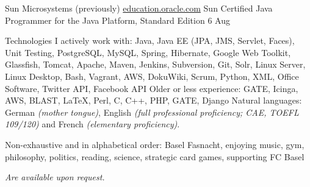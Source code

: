 \documentclass[10pt,a4paper]{article}
\begin{document}
\headedsection
  {Sun Microsystems (previously)}
  {\href{http://education.oracle.com/}{education.oracle.com}} {%
  \headedsubsection
    {Sun Certified Java Programmer for the Java Platform, Standard Edition 6}
    {Aug }
    {\bodytext{}}
}

\spacedhrule{0.5em}{-0.4em}


\inlineheadsection  %
  {Technologies I actively work with:}
  {Java, Java EE (JPA, JMS, Servlet, Faces), Unit Testing, PostgreSQL, MySQL, Spring, Hibernate, Google Web Toolkit, Glassfish, Tomcat, Apache, Maven, Jenkins, Subversion, Git, Solr, Linux Server, Linux Desktop, Bash, Vagrant, AWS, DokuWiki, Scrum, Python, XML, Office Software, Twitter API, Facebook API}
\inlineheadsection
  {Older or less experience:}
  {GATE, Icinga, AWS, BLAST, LaTeX, Perl, C, C++, PHP, GATE, Django}
\inlineheadsection
  {Natural languages:}
  {German \emph{(mother tongue)}, English \emph{(full professional proficiency; CAE, TOEFL 109/120)} and French \emph{(elementary proficiency)}.}

\spacedhrule{1.6em}{-0.4em}


\inlineheadsection
  {Non-exhaustive and in alphabetical order:}
  {Basel Fasnacht, enjoying music, gym, philosophy, politics, reading, science, strategic card games, supporting FC Basel}

\spacedhrule{1.6em}{-0.4em}

\emph{Are available upon request.}
\end{document}
